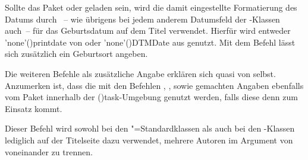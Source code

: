 \begin{DeclareEntity*}{}
\begin{DeclareEntity*}{}
\begin{DeclareEntity*}{}
\begin{Declaration}
\begin{Declaration}
\begin{Declaration}
\begin{Declaration}
\begin{Declaration}
\begin{Declaration}
\begin{Declaration}
\begin{Declaration}
\begin{Declaration}
\begin{Declaration}
Sollte das Paket  oder  geladen sein, wird 
die damit eingestellte Formatierung des Datums durch ~-- wie 
übrigens bei jedem anderem Datumsfeld der \TUDScript-Klassen auch~-- für das 
Geburtsdatum auf dem Titel verwendet. Hierfür wird entweder 
\Macro'none'(){printdate} von  oder 
\Macro'none'(){DTMDate} aus  genutzt. Mit 
dem Befehl  lässt sich zusätzlich ein Geburtsort angeben.

Die weiteren Befehle als zusätzliche Angabe erklären sich quasi von selbst. 
Anzumerken ist, dass die mit den Befehlen , 
,  sowie  gemachten 
Angaben ebenfalls vom Paket  innerhalb der 
\Environment(){task}-Umgebung genutzt werden, falls 
diese denn zum Einsatz kommt.
\end{Declaration}
\end{Declaration}
\end{Declaration}
\end{Declaration}
\end{Declaration}
\end{Declaration}
\end{Declaration}
\end{Declaration}
\end{Declaration}
\end{Declaration}

\begin{Declaration}
  {}

Dieser Befehl wird sowohl bei den "=Standardklassen als auch 
bei den \KOMAScript-Klassen lediglich auf der Titelseite dazu verwendet, 
mehrere Autoren im Argument von  voneinander zu trennen.


\end{Declaration}
\end{DeclareEntity*}
\end{DeclareEntity*}
\end{DeclareEntity*}
